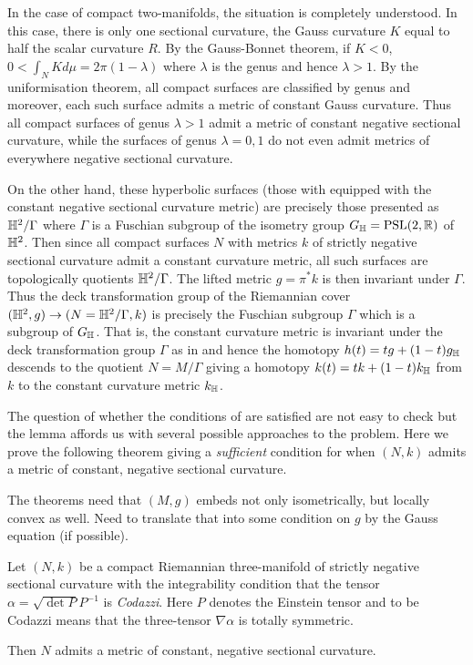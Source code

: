\documentclass[a4paper, 12pt]{amsart}
\begin{document}
\begin{rem}
In the case of compact two-manifolds, the situation is completely understood. In this case, there is only one sectional curvature, the Gauss curvature \(K\) equal to half the scalar curvature \(R\). By the Gauss-Bonnet theorem, if \(K < 0\), \(0 < \int_N K d\mu = 2\pi(1-\lambda)\) where \(\lambda\) is the genus and hence \(\lambda > 1\). By the uniformisation theorem, all compact surfaces are classified by genus and moreover, each such surface admits a metric of constant Gauss curvature. Thus all compact surfaces of genus \(\lambda > 1\) admit a metric of constant negative sectional curvature, while the surfaces of genus \(\lambda = 0, 1\) do not even admit metrics of everywhere negative sectional curvature.

On the other hand, these hyperbolic surfaces (those with equipped with the constant negative sectional curvature metric) are precisely those presented as \(\mathbb{H}^2/\Gamma\) where \(\Gamma\) is a Fuschian subgroup of the isometry group \(G_{\mathbb{H}} = \text{PSL}(2, \mathbb{R})\) of \(\mathbb{H}^2\). Then since all compact surfaces \(N\) with metrics \(k\) of strictly negative sectional curvature admit a constant curvature metric, all such surfaces are topologically quotients \(\mathbb{H}^2/\Gamma\). The lifted metric \(g = \pi^{\ast} k\) is then invariant under \(\Gamma\). Thus the deck transformation group of the Riemannian cover \((\mathbb{H}^2, g) \to (N = \mathbb{H}^2/\Gamma, k)\) is precisely the Fuschian subgroup \(\Gamma\) which is a subgroup of \(G_{\mathbb{H}}\). That is, the constant curvature metric is invariant under the deck transformation group \(\Gamma\) as in  and hence the homotopy \(h(t) = t g + (1-t)g_{\mathbb{H}}\) descends to the quotient \(N = M/\Gamma\) giving a homotopy \(k(t) = t k + (1-t)k_{\mathbb{H}}\) from \(k\) to the constant curvature metric \(k_{\mathbb{H}}\).
\end{rem}

The question of whether the conditions of  are satisfied are not easy to check but the lemma affords us with several possible approaches to the problem. Here we prove the following theorem giving a \emph{sufficient} condition for when \((N, k)\) admits a metric of constant, negative sectional curvature.

{\color{red} The theorems need that \((M, g)\) embeds not only isometrically, but locally convex as well. Need to translate that into some condition on \(g\) by the Gauss equation (if possible).}

\begin{thm}
\label{thm:intg_const_curv}
Let \((N, k)\) be a compact Riemannian three-manifold of strictly negative sectional curvature with the integrability condition that the tensor \(\alpha = \sqrt{\det P} P^{-1}\) is \emph{Codazzi}. Here \(P\) denotes the Einstein tensor and to be Codazzi means that the three-tensor \(\nabla \alpha\) is totally symmetric.

Then \(N\) admits a metric of constant, negative sectional curvature.
\end{thm}
\end{document}
